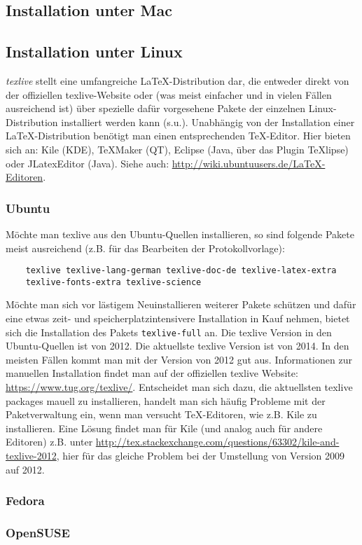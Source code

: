 \subsection{Installation unter Mac}

\subsection{Installation unter Linux}
\textit{texlive} stellt eine umfangreiche LaTeX-Distribution dar, die entweder direkt von der offiziellen texlive-Website oder (was meist einfacher und in vielen Fällen ausreichend ist) über spezielle dafür vorgesehene Pakete der einzelnen Linux-Distribution installiert werden kann (s.u.). Unabhängig von der Installation einer LaTeX-Distribution benötigt man einen entsprechenden TeX-Editor. Hier bieten sich an: Kile (KDE), TeXMaker (QT), Eclipse (Java, über das Plugin TeXlipse) oder JLatexEditor (Java). Siehe auch: \url{http://wiki.ubuntuusers.de/LaTeX-Editoren}.

\subsubsection{Ubuntu}
Möchte man texlive aus den Ubuntu-Quellen installieren, so sind folgende Pakete meist ausreichend (z.B. für das Bearbeiten der Protokollvorlage):
\begin{verbatim}
	texlive texlive-lang-german texlive-doc-de texlive-latex-extra
	texlive-fonts-extra texlive-science
\end{verbatim}
Möchte man sich vor lästigem Neuinstallieren weiterer Pakete schützen und dafür eine etwas zeit- und speicherplatzintensivere Installation in Kauf nehmen, bietet sich die Installation des Pakets \verb|texlive-full| an. Die texlive Version in den Ubuntu-Quellen ist von 2012. Die aktuellste texlive Version ist von 2014. In den meisten Fällen kommt man mit der Version von 2012 gut aus. Informationen zur manuellen Installation findet man auf der offiziellen texlive Website: \url{https://www.tug.org/texlive/}. Entscheidet man sich dazu, die aktuellsten texlive packages mauell zu installieren, handelt man sich häufig Probleme mit der Paketverwaltung ein, wenn man versucht TeX-Editoren, wie z.B. Kile zu installieren. Eine Lösung findet man für Kile (und analog auch für andere Editoren) z.B. unter \url{http://tex.stackexchange.com/questions/63302/kile-and-texlive-2012}, hier für das gleiche Problem bei der Umstellung von Version 2009 auf 2012.

\subsubsection{Fedora}

\subsubsection{OpenSUSE}
